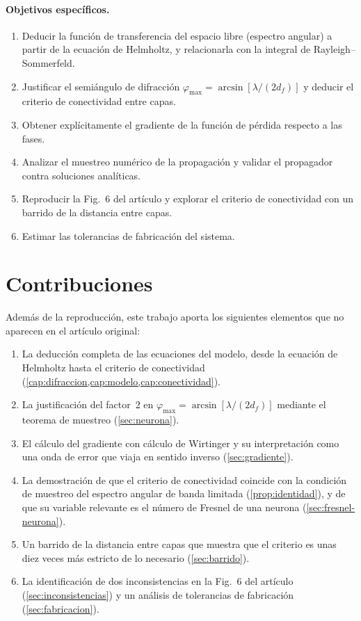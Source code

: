 \paragraph{Objetivos específicos.}
\begin{enumerate}
  \item Deducir la función de transferencia del espacio libre (espectro angular) a partir de
        la ecuación de Helmholtz, y relacionarla con la integral de Rayleigh--Sommerfeld.
  \item Justificar el semiángulo de difracción $\varphi_{\max}=\arcsin[\lambda/(2d_f)]$ y
        deducir el criterio de conectividad entre capas.
  \item Obtener explícitamente el gradiente de la función de pérdida respecto a las fases.
  \item Analizar el muestreo numérico de la propagación y validar el propagador contra
        soluciones analíticas.
  \item Reproducir la Fig.~6 del artículo y explorar el criterio de conectividad con un
        barrido de la distancia entre capas.
  \item Estimar las tolerancias de fabricación del sistema.
\end{enumerate}

\section{Contribuciones}\label{sec:contribuciones}

Además de la reproducción, este trabajo aporta los siguientes elementos que no aparecen en el
artículo original:
\begin{enumerate}
  \item La deducción completa de las ecuaciones del modelo, desde la ecuación de Helmholtz
        hasta el criterio de conectividad (\cref{cap:difraccion,cap:modelo,cap:conectividad}).
  \item La justificación del factor~2 en $\varphi_{\max}=\arcsin[\lambda/(2d_f)]$ mediante el
        teorema de muestreo (\cref{sec:neurona}).
  \item El cálculo del gradiente con cálculo de Wirtinger y su interpretación como una onda
        de error que viaja en sentido inverso (\cref{sec:gradiente}).
  \item La demostración de que el criterio de conectividad coincide con la condición de
        muestreo del espectro angular de banda limitada (\cref{prop:identidad}), y de que su
        variable relevante es el número de Fresnel de una neurona (\cref{sec:fresnel-neurona}).
  \item Un barrido de la distancia entre capas que muestra que el criterio es unas diez veces
        más estricto de lo necesario (\cref{sec:barrido}).
  \item La identificación de dos inconsistencias en la Fig.~6 del artículo
        (\cref{sec:inconsistencias}) y un análisis de tolerancias de fabricación
        (\cref{sec:fabricacion}).
\end{enumerate}

